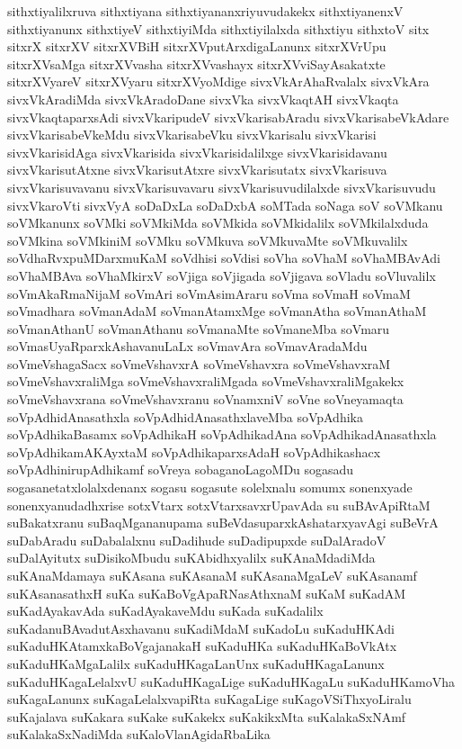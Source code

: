 {sithxtiyalilxruva
sithxtiyana
sithxtiyananxriyuvudakekx
sithxtiyanenxV
sithxtiyanunx
sithxtiyeV
sithxtiyiMda
sithxtiyilalxda
sithxtiyu
sithxtoV
sitx
sitxrX
sitxrXV
sitxrXVBiH
sitxrXVputArxdigaLanunx
sitxrXVrUpu
sitxrXVsaMga
sitxrXVvasha
sitxrXVvashayx
sitxrXVviSayAsakatxte
sitxrXVyareV
sitxrXVyaru
sitxrXVyoMdige
sivxVkArAhaRvalalx
sivxVkAra
sivxVkAradiMda
sivxVkAradoDane
sivxVka
sivxVkaqtAH
sivxVkaqta
sivxVkaqtaparxsAdi
sivxVkaripudeV
sivxVkarisabAradu
sivxVkarisabeVkAdare
sivxVkarisabeVkeMdu
sivxVkarisabeVku
sivxVkarisalu
sivxVkarisi
sivxVkarisidAga
sivxVkarisida
sivxVkarisidalilxge
sivxVkarisidavanu
sivxVkarisutAtxne
sivxVkarisutAtxre
sivxVkarisutatx
sivxVkarisuva
sivxVkarisuvavanu
sivxVkarisuvavaru
sivxVkarisuvudilalxde
sivxVkarisuvudu
sivxVkaroVti
sivxVyA
soDaDxLa
soDaDxbA
soMTada
soNaga
soV
soVMkanu
soVMkanunx
soVMki
soVMkiMda
soVMkida
soVMkidalilx
soVMkilalxduda
soVMkina
soVMkiniM
soVMku
soVMkuva
soVMkuvaMte
soVMkuvalilx
soVdhaRvxpuMDarxmuKaM
soVdhisi
soVdisi
soVha
soVhaM
soVhaMBAvAdi
soVhaMBAva
soVhaMkirxV
soVjiga
soVjigada
soVjigava
soVladu
soVluvalilx
soVmAkaRmaNijaM
soVmAri
soVmAsimAraru
soVma
soVmaH
soVmaM
soVmadhara
soVmanAdaM
soVmanAtamxMge
soVmanAtha
soVmanAthaM
soVmanAthanU
soVmanAthanu
soVmanaMte
soVmaneMba
soVmaru
soVmasUyaRparxkAshavanuLaLx
soVmavAra
soVmavAradaMdu
soVmeVshagaSacx
soVmeVshavxrA
soVmeVshavxra
soVmeVshavxraM
soVmeVshavxraliMga
soVmeVshavxraliMgada
soVmeVshavxraliMgakekx
soVmeVshavxrana
soVmeVshavxranu
soVnamxniV
soVne
soVneyamaqta
soVpAdhidAnasathxla
soVpAdhidAnasathxlaveMba
soVpAdhika
soVpAdhikaBasamx
soVpAdhikaH
soVpAdhikadAna
soVpAdhikadAnasathxla
soVpAdhikamAKAyxtaM
soVpAdhikaparxsAdaH
soVpAdhikashacx
soVpAdhinirupAdhikamf
soVreya
sobaganoLagoMDu
sogasadu
sogasanetatxlolalxdenanx
sogasu
sogasute
solelxnalu
somumx
sonenxyade
sonenxyanudadhxrise
sotxVtarx
sotxVtarxsavxrUpavAda
su
suBAvApiRtaM
suBakatxranu
suBaqMgananupama
suBeVdasuparxkAshatarxyavAgi
suBeVrA
suDabAradu
suDabalalxnu
suDadihude
suDadipupxde
suDalAradoV
suDalAyitutx
suDisikoMbudu
suKAbidhxyalilx
suKAnaMdadiMda
suKAnaMdamaya
suKAsana
suKAsanaM
suKAsanaMgaLeV
suKAsanamf
suKAsanasathxH
suKa
suKaBoVgApaRNasAthxnaM
suKaM
suKadAM
suKadAyakavAda
suKadAyakaveMdu
suKada
suKadalilx
suKadanuBAvadutAsxhavanu
suKadiMdaM
suKadoLu
suKaduHKAdi
suKaduHKAtamxkaBoVgajanakaH
suKaduHKa
suKaduHKaBoVkAtx
suKaduHKaMgaLalilx
suKaduHKagaLanUnx
suKaduHKagaLanunx
suKaduHKagaLelalxvU
suKaduHKagaLige
suKaduHKagaLu
suKaduHKamoVha
suKagaLanunx
suKagaLelalxvapiRta
suKagaLige
suKagoVSiThxyoLiralu
suKajalava
suKakara
suKake
suKakekx
suKakikxMta
suKalakaSxNAmf
suKalakaSxNadiMda
suKaloVlanAgidaRbaLika
}
